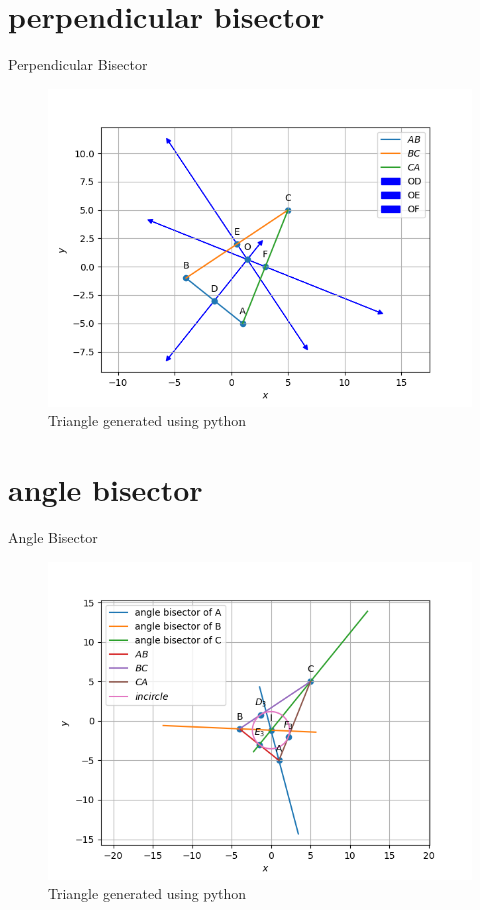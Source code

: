 \documentclass[journal,12pt,onecolumn]{IEEEtran}
\theoremstyle{remark}
\begin{document}
\begin{table}[!ht]
	\section{perpendicular bisector}
	\centering
	
	\caption{Perpendicular Bisector}
	\label{table:Perpendicular Bisector}
\end{table}

\begin{figure}
\includegraphics[width=\columnwidth]{./figs/Q1.4.1.png}
\caption{Triangle generated using python}
\label{fig:perpendicular bisector}
\end{figure}

\begin{table}[!ht]
	\section{angle bisector}
	\centering
	
	\caption{Angle Bisector}
	\label{table:Angle Bisector}
\end{table}

\begin{figure}
\includegraphics[width=\columnwidth]{./figs/Q1.5.1.png}
\caption{Triangle generated using python}
\label{fig:angle bisector}
\end{figure}
\end{document}
